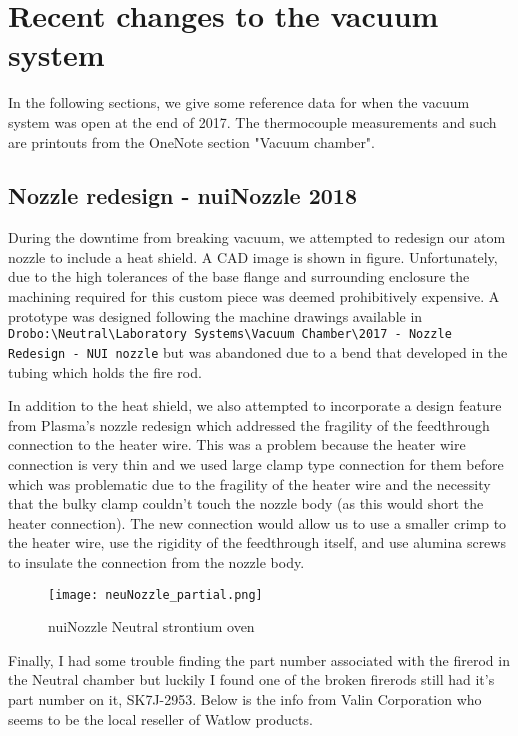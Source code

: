\chapter{Recent changes to the vacuum system} \label{app:breakingVacuum}
In the following sections, we give some reference data for when the vacuum system was open at the end of 2017.
The thermocouple measurements and such are printouts from the OneNote section "Vacuum chamber".

\section{Nozzle redesign - nuiNozzle 2018}
During the downtime from breaking vacuum, we attempted to redesign our atom nozzle to include a heat shield. A CAD image is shown in figure. Unfortunately, due to the high tolerances of the base flange and surrounding enclosure the machining required for this custom piece was deemed prohibitively expensive. A prototype was designed following the machine drawings available in \texttt{Drobo:\textbackslash Neutral\textbackslash Laboratory Systems\textbackslash Vacuum Chamber\textbackslash 2017 - Nozzle Redesign - NUI nozzle} but was abandoned due to a bend that developed in the tubing which holds the fire rod. 

In addition to the heat shield, we also attempted to incorporate a design feature from Plasma's nozzle redesign which addressed the fragility of the feedthrough connection to the heater wire. 
This was a problem because the heater wire connection is very thin and we used large clamp type connection for them before which was problematic due to the fragility of the heater wire and the necessity that the bulky clamp couldn't touch the nozzle body (as this would short the heater connection). 
The new connection would allow us to use a smaller crimp to the heater wire, use the rigidity of the feedthrough itself, and use alumina screws to insulate the connection from the nozzle body.
	
	\begin{figure} 
		\centerline{
		\texttt{[image: neuNozzle\_partial.png]}}
		\caption{nuiNozzle Neutral strontium oven}{}
		\label{fig:nuiNozzle}
	\end{figure}

Finally, I had some trouble finding the part number associated with the firerod in the Neutral chamber but luckily I found one of the broken firerods still had it's part number on it, SK7J-2953. 
Below is the info from Valin Corporation who seems to be the local reseller of Watlow products.

